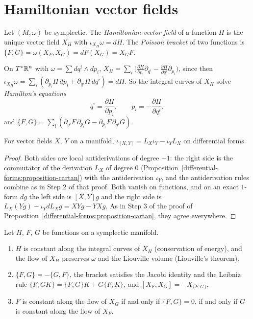 \section{Hamiltonian vector fields}\label{symplectic-geometry:section-hamiltonian}

\begin{definition}\label{symplectic-geometry:definition-hamiltonian}
Let $(M, \omega)$ be symplectic. The \emph{Hamiltonian vector field} of a function $H$ is the unique vector field $X_H$ with $\iota_{X_H}\omega = dH$. The \emph{Poisson bracket} of two functions is
$\{F, G\} = \omega(X_F, X_G) = dF(X_G) = X_GF$.
\end{definition}

On $T^*\mathbb{R}^n$ with $\omega = \sum dq^i \wedge dp_i$, $X_H = \sum_i\bigl(\frac{\partial H}{\partial p_i}\partial_{q^i} - \frac{\partial H}{\partial q^i}\partial_{p_i}\bigr)$, since then
$\iota_{X_H}\omega = \sum_i(\partial_{p_i}H\,dp_i + \partial_{q^i}H\,dq^i) = dH$. So the integral curves of $X_H$ solve \emph{Hamilton's equations}
\[
\dot q^i = \frac{\partial H}{\partial p_i}, \qquad \dot p_i = -\frac{\partial H}{\partial q^i},
\]
and $\{F, G\} = \sum_i(\partial_{q^i}F\,\partial_{p_i}G - \partial_{p_i}F\,\partial_{q^i}G)$.

\begin{lemma}\label{symplectic-geometry:lemma-interior-bracket}
For vector fields $X$, $Y$ on a manifold, $\iota_{[X, Y]} = L_X\iota_Y - \iota_YL_X$ on differential forms.
\end{lemma}

\begin{proof}
Both sides are local antiderivations of degree $-1$: the right side is the commutator of the derivation $L_X$ of degree $0$ (Proposition~\ref{differential-forms:proposition-cartan}) with the antiderivation
$\iota_Y$, and the antiderivation rules combine as in Step 2 of that proof. Both vanish on functions, and on an exact $1$-form $dg$ the left side is $[X, Y]g$ and the right side is
$L_X(Yg) - \iota_YdL_Xg = XYg - YXg$. As in Step 3 of the proof of Proposition~\ref{differential-forms:proposition-cartan}, they agree everywhere.
\end{proof}

\begin{proposition}\label{symplectic-geometry:proposition-hamiltonian}
Let $H$, $F$, $G$ be functions on a symplectic manifold.
\begin{enumerate}
\item $H$ is constant along the integral curves of $X_H$ (conservation of energy), and the flow of $X_H$ preserves $\omega$ and the Liouville volume (Liouville's theorem).
\item $\{F, G\} = -\{G, F\}$, the bracket satisfies the Jacobi identity and the Leibniz rule $\{F, GK\} = \{F, G\}K + G\{F, K\}$, and $[X_F, X_G] = -X_{\{F, G\}}$.
\item $F$ is constant along the flow of $X_G$ if and only if $\{F, G\} = 0$, if and only if $G$ is constant along the flow of $X_F$.
\end{enumerate}
\end{proposition}

